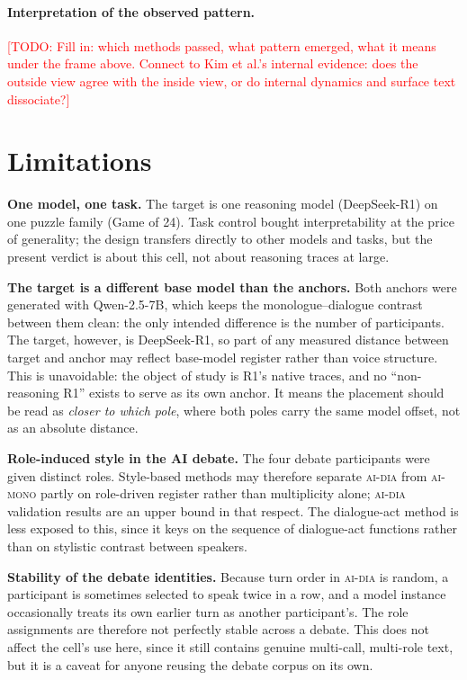 \documentclass[11pt]{article}
\newcommand{\todo}[1]{\textcolor{red}{[TODO: #1]}}
\newcommand{\cellad}{\textsc{ai-dia}}
\newcommand{\cellam}{\textsc{ai-mono}}
\begin{document}
\paragraph{Interpretation of the observed pattern.}
\todo{Fill in: which methods passed, what pattern emerged, what it means
under the frame above. Connect to Kim et al.'s internal evidence: does the
outside view agree with the inside view, or do internal dynamics and surface
text dissociate?}

\section{Limitations}
\label{sec:limitations}

\textbf{One model, one task.} The target is one reasoning model
(DeepSeek-R1) on one puzzle family (Game of 24). Task control bought
interpretability at the price of generality; the design transfers directly
to other models and tasks, but the present verdict is about this cell, not
about reasoning traces at large.

\textbf{The target is a different base model than the anchors.} Both anchors
were generated with Qwen-2.5-7B, which keeps the monologue--dialogue
contrast between them clean: the only intended difference is the number of
participants. The target, however, is DeepSeek-R1, so part of any measured
distance between target and anchor may reflect base-model register rather
than voice structure. This is unavoidable: the object of study is R1's
native traces, and no ``non-reasoning R1'' exists to serve as its own
anchor. It means the placement should be read as \emph{closer to which
pole}, where both poles carry the same model offset, not as an absolute
distance.

\textbf{Role-induced style in the AI debate.} The four debate participants
were given distinct roles. Style-based methods may therefore separate
\cellad{} from \cellam{} partly on role-driven register rather than
multiplicity alone; \cellad{} validation results are an upper bound in that
respect. The dialogue-act method is less exposed to this, since it keys on the
sequence of dialogue-act functions rather than on stylistic contrast between
speakers.

\textbf{Stability of the debate identities.} Because turn order in \cellad{}
is random, a participant is sometimes selected to speak twice in a row, and a
model instance occasionally treats its own earlier turn as another
participant's. The role assignments are therefore not perfectly stable across
a debate. This does not affect the cell's use here, since it still contains
genuine multi-call, multi-role text, but it is a caveat for anyone reusing
the debate corpus on its own.
\end{document}
